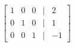\documentclass[preview]{standalone}
\begin{document}
\begin{align*}
\begin{bmatrix} 1 & 0 & 0 & | & 2 \\ 0 & 1 & 0 & | & 1 \\ 0 & 0 & 1 & | & -1 \end{bmatrix}
\end{align*}
\end{document}

